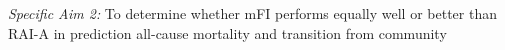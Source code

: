 \emph{Specific Aim 2:} To determine whether mFI performs equally well or better than RAI-A in prediction all-cause mortality and transition from community